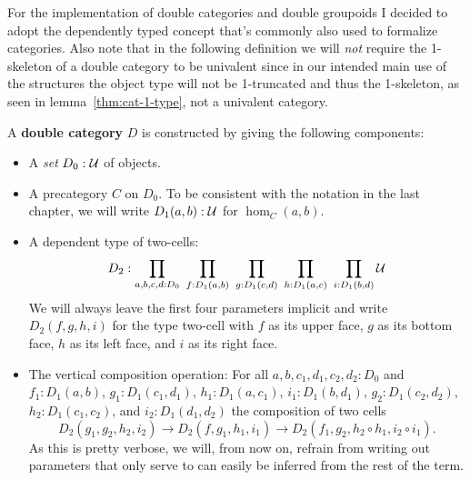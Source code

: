 For the implementation of double categories and double groupoids I decided to
adopt the dependently typed concept that's commonly also used to formalize categories.
Also note that in the following definition we will \emph{not} require the
1-skeleton of a double category to be univalent since in our intended main
use of the structures the object type will not be 1-truncated and thus the
1-skeleton, as seen in lemma~\ref{thm:cat-1-type}, not a univalent category.

\begin{defn} \label{def:dbl-cat-hott}
A \textbf{double category} $D$ is constructed by giving the following components:
\begin{itemize}
\item A \emph{set} $D_0 : \mathcal{U}$ of objects.
\item A precategory $C$ on $D_0$. To be consistent with the notation in the last
chapter, we will write $D_1(a, b) : \mathcal{U}$ for $\hom_C(a, b)$.
\item A dependent type of two-cells:
\begin{equation*}
D_2 : \prod_{a,b,c,d:D_0} ~ \prod_{f:D_1(a,b)} ~ \prod_{g:D_1(c,d)}
	~ \prod_{h:D_1(a,c)} ~ \prod_{i:D_1(b,d)} \mathcal{U}
\end{equation*}
We will always leave the first four parameters implicit and write $D_2(f,g,h,i)$
for the type two-cell with $f$ as its upper face, $g$ as its bottom face,
$h$ as its left face, and $i$ as its right face.
\item The vertical composition operation: For all $a, b, c_1, d_1, c_2, d_2 : D_0$
and $f_1 : D_1(a, b)$, $g_1 : D_1(c_1, d_1)$, $h_1 : D_1(a, c_1)$, $i_1 : D_1(b, d_1)$,
$g_2 : D_1(c_2, d_2)$, $h_2 : D_1(c_1, c_2)$, and $i_2 : D_1(d_1, d_2)$ the composition
of two cells
\begin{equation*}
D_2(g_1, g_2, h_2, i_2) \to D_2(f, g_1, h_1, i_1) 
	\to D_2(f_1, g_2, h_2 \circ h_1, i_2 \circ i_1) \text{.}
\end{equation*}
As this is pretty verbose, we will, from now on, refrain from writing out parameters
that only serve to can easily be inferred from the rest of the term. %


\end{itemize}
\end{defn}
